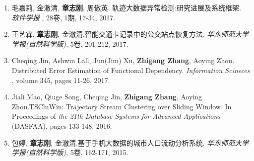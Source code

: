 \begin{enumerate}
	
	\item 毛嘉莉, 金澈清, \textbf{章志刚}, 周傲英. 轨迹大数据异常检测:研究进展及系统框架. \textit{软件学报} , 28卷, 1期, 17-34, 2017.
	
	\item 王艺霖, \textbf{章志刚}, 金澈清.智能交通卡记录中的公交站点恢复方法.  \textit{华东师范大学学报(自然科学版)}, 5卷, 201-212, 2017.
	
	\item  Cheqing Jin, Ashwin Lall, Jun(Jim) Xu, \textbf{Zhigang Zhang},  Aoying Zhou. Distributed Error Estimation of Functional Dependency. \textit{Information Scineces} , volume 345, pages 11-26, 2017.
	
	\item  Jiali Mao, Qiuge Song, Cheqing Jin, \textbf{Zhigang Zhang},  Aoying Zhou.TSCluWin: Trajectory Stream Clustering over Sliding Window. In Proceedings of \textit{the 21th Database Systems for Advanced Applications} (DASFAA), pages 133-148, 2016.
	
	\item 包婷, \textbf{章志刚}, 金澈清.基于手机大数据的城市人口流动分析系统.  \textit{华东师范大学学报(自然科学版)}, 5卷, 162-171, 2015.

\end{enumerate}

%
%	
%	
%	
%	
%		
%
